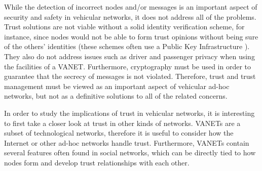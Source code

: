 
While the detection of incorrect nodes and/or messages is an important aspect of security and safety in vehicular networks, it does not address all of the problems.
Trust solutions are not viable without a solid identity verification scheme, for instance, since nodes would not be able to form trust opinions without being sure of the others' identities (these schemes often use a Public Key Infrastructure \cite{wasef2010complementing}).
They also do not address issues such as driver and passenger privacy when using the facilities of a VANET.
Furthermore, cryptography must be used in order to guarantee that the secrecy of messages is not violated.
Therefore, trust and trust management must be viewed as an important aspect of vehicular ad-hoc networks, but not as a definitive solutions to all of the related concerns.

In order to study the implications of trust in vehicular networks, it is interesting to first take a closer look at trust in other kinds of networks.
VANETs are a subset of technological networks, therefore it is useful to consider how the Internet or other ad-hoc networks handle trust.
Furthermore, VANETs contain several features often found in social networks, which can be directly tied to how nodes form and develop trust relationships with each other.


